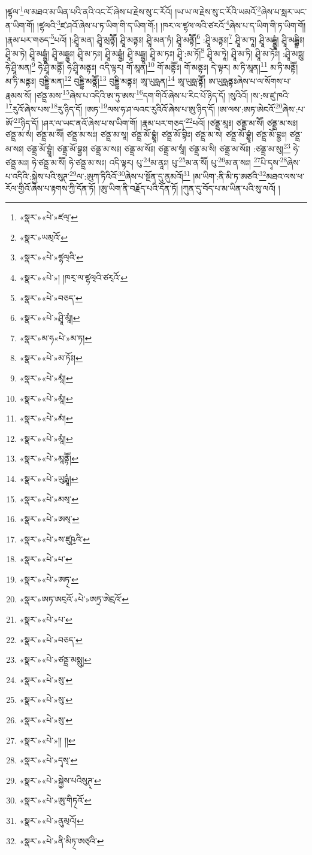 །ཛྷལ་\footnote{«སྣར་»«པེ་»ཛལ྄་}ལ་མཐའ་མ་ཡིན་པའི་ནའི་འང་ངོ་ཞེས་པ་རྗེས་སུ་ང་རོའོ། །ཡ་ཡ་ལ་རྗེས་སུ་ང་རོའི་ཡམའོ་\footnote{«སྣར་»ཡམ྄འོ་}ཞེས་པ་སླར་ཡང་ན་ཡིག་གོ། །ཛྷལའི་\footnote{«སྣར་»«པེ་»ཛྷལ྄འི་}ཛ་ཤའོ་ཞེས་པ་ཏ་ཡིག་གི་ད་ཡིག་གོ:། །ཁར་ལ་ཛྷལ་ལའི་ཙརའོ་\footnote{«སྣར་»«པེ་»། །ཁར྄་ལ་ཛྷལ྄འི་ཙར྄འོ་}ཞེས་པ་ད་ཡིག་གི་ཏ་ཡིག་གོ། །རྣམ་པར་གཅད་\footnote{«སྣར་»«པེ་»བཅད་}པའོ། །:ཤྲཱི་མན། ཤྲཱི་མྲནྟཽ། ཤྲཱི་མནྟཿ། ཤྲཱི་མན་ཏཾ། ཤྲཱི་མནྟཽ།\footnote{«སྣར་»«པེ་»ཤྲཱི་མཱཾ།} :ཤྲཱི་མནྟཿ།\footnote{«སྣར་»མ་ཧ«པེ་»མ་ཏ།} ཤྲཱི་མ་ཏཱ། ཤྲཱི་མདྦྷྱཱཾ། ཤྲཱི་མདྦྷིཿ། ཤྲཱི་མ་ཏེ། ཤྲཱི་མདྦྷྱཱཾ། ཤྲཱི་མདྦྷྱཿ། ཤྲཱི་མ་ཏཿ། ཤྲཱི་མདྦྷྱཾ། ཤྲཱི་མདྦྷྱཱ། ཤྲཱི་མ་ཏཿ། ཤྲཱི་:མ་ཏོ།\footnote{«སྣར་»«པེ་»མ་ཏོཿ།} ཤྲཱི་མ་ཏཱེ། ཤྲཱི་མ་ཏི། ཤྲཱི་མ་ཏོཿ། :ཤྲཱི་མཏྶུ། ཧེ་ཤྲཱི་མན།\footnote{«སྣར་»«པེ་»མཱཾ།} ཧེ་ཤྲཱི་མནྟཽ། ཧེ་ཤྲཱི་མནྟཿ། འདི་ལྟར། གོ་མཱན།\footnote{«སྣར་»«པེ་»མཱཾ།} གོ་མནྟཽཿ། གོ་མནྟཿ། དེ་ལྟར། མ་ཏི་མཱན།\footnote{«སྣར་»«པེ་»མཾ།} མ་ཏི་མནྟཽ། མ་ཏི་མནྟཿ། བུདྡྷི་མན།\footnote{«སྣར་»«པེ་»མཱཾ།} བུདྡྷི་མནྣཽ།\footnote{«སྣར་»«པེ་»མཱནྟཽ།} བུདྡྷི་མནྟཿ། ཨཱ་ཡུཥྨན།\footnote{«སྣར་»«པེ་»ཡུཥྨཱཾ།} ཨཱ་ཡུཥྨ་ནྟཽ། ཨ་ཡུཥྨནྟཿཞེས་པ་ལ་སོགས་པ་རྣམས་སོ། །ཙནྡྲ་མས་\footnote{«སྣར་»«པེ་»མས྄་}ཞེས་པ་འདིའི་ཨ་ཏུ་ཨས་\footnote{«སྣར་»«པེ་»ཨས྄་}དག་གིའོ་ཞེས་པ་རིང་པོ་ཉིད་དོ། །སུའིའོ། །ས་:ས་ཛུ་ཁའི་\footnote{«སྣར་»«པེ་»ས་ཛུཥྲའི་}རུའོ་ཞེས་པས་\footnote{«སྣར་»«པེ་»པ་}རུ་ཉིད་དོ། །ཨཏ་\footnote{«སྣར་»«པེ་»ཨཏ྄་}ལས་ཧ་ཤ་ལའང་རུའིའོ་ཞེས་པ་ཨུ་ཉིད་དོ། །ཨ་ལས་:ཨཏ་ཨེངའོ་\footnote{«སྣར་»ཨཏ་ཨང྄འོ་«པེ་»ཨཏྲ་ཨེངྲའོ་}ཞེས་:པ་ཨོ་\footnote{«སྣར་»«པེ་»པ་}ཉིད་དོ། །ཤར་ལ་ཡང་ནའོ་ཞེས་པ་ས་ཡིག་གོ། །རྣམ་པར་གཅད་\footnote{«སྣར་»«པེ་»བཅད་}པའོ། །ཙནྡྲ་མཱཿ། ཙནྡྲ་མ་སཽ། ཙནྡྲ་མ་སཿ། ཙནྡྲ་མ་སཾ། ཙནྡྲ་མ་སཽ། ཙནྡྲ་མ་སཿ། ཙནྡྲ་མ་སཱ། ཙནྡྲ་མོ་བྷྱཱཾ། ཙནྡྲ་མོ་བྷིཿ། ཙནྡྲ་མ་སེ། ཙནྡྲ་མོ་བྷྱཱཾ། ཙནྡྲ་མོ་བྷྱཿ། ཙནྡྲ་མ་སཿ། ཙནྡྲ་མོ་བྷྱཱཾ། ཙནྡྲ་མོ་བྷྱཿ། ཙནྡྲ་མ་སཿ། ཙནྡྲ་མ་སོཿ། ཙནྡྲ་མ་སཱཾ། ཙནྡྲ་མ་སི། ཙནྡྲ་མ་སོཿ། :ཙནྡྲ་མ་སུ།\footnote{«སྣར་»«པེ་»ཙནྡྲ་མསྶུ།} ཧེ་ཙནྡྲ་མཿ། ཧེ་ཙནྡྲ་མ་སཽ། ཧེ་ཙནྡྲ་མ་སཿ། འདི་ལྟར། པུ་\footnote{«སྣར་»«པེ་»སུ་}མ་ནཱཿ། པུ་\footnote{«སྣར་»«པེ་»སུ་}མ་ན་སཽ། པུ་\footnote{«སྣར་»«པེ་»སུ་}མ་ན་སཿ། \footnote{«སྣར་»«པེ་»།། །།}པི་དྭས་\footnote{«སྣར་»«པེ་»དྭས྄་}ཞེས་པ་འདིའི་:སྐྱེས་པའི་སུཊ་\footnote{«སྣར་»«པེ་»སྐྱེས་པའིསུཊ྄་}ལ་:ཨུཀ་ཏིའིའོ་\footnote{«སྣར་»«པེ་»ཨུ་གིཏ྄འོ་}ཞེས་པ་སྔོན་དུ་ནུམའོ།\footnote{«སྣར་»«པེ་»ནུམ྄འོ།} །མ་ཡིག་:ནི་མི་ཏ་ཨཙའི་\footnote{«སྣར་»«པེ་»ནི་མིཏ྄་ཨཙ྄འི་}མཐའ་ལས་ཕ་རོལ་གྱིའོ་ཞེས་པ་རྟགས་ཀྱི་དོན་ཏོ། །ཨུ་ཡིག་ནི་བརྗོད་པའི་དོན་ཏོ། །ཀུན་དུ་བོད་པ་མ་ཡིན་པའི་སུ་ལའོ། །
